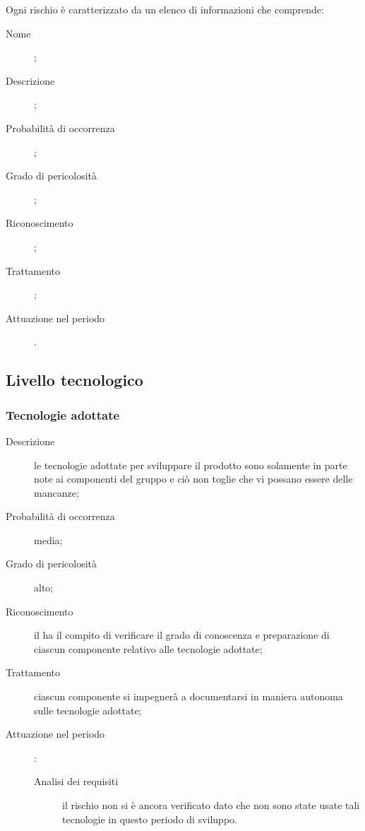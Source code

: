 Ogni rischio è caratterizzato da un elenco di informazioni che comprende:
\begin{description}
	\item[Nome];
	\item[Descrizione];
	\item[Probabilità di occorrenza];
	\item[Grado di pericolosità];
	\item[Riconoscimento];
	\item[Trattamento];
	\item[Attuazione nel periodo].
\end{description}
	\subsection{Livello tecnologico} \label{sec:tec}
		\subsubsection{Tecnologie adottate}
		\begin{description}
			\item[Descrizione] le tecnologie adottate per sviluppare il prodotto sono solamente in parte note ai componenti del gruppo e ciò non toglie che vi possano essere delle mancanze;
			\item[Probabilità di occorrenza] media;
			\item[Grado di pericolosità] alto;
			\item[Riconoscimento] il \Rx{} ha il compito di verificare il grado di conoscenza e preparazione di ciascun componente relativo alle tecnologie adottate;
			\item[Trattamento] ciascun componente si impegnerà a documentarsi in maniera autonoma sulle tecnologie adottate;
			\item[Attuazione nel periodo]:
			 \begin{description}
				\item[Analisi dei requisiti] il rischio non si è ancora verificato dato che non sono state usate tali tecnologie in questo periodo di sviluppo.
			\end{description}
		\end{description}
